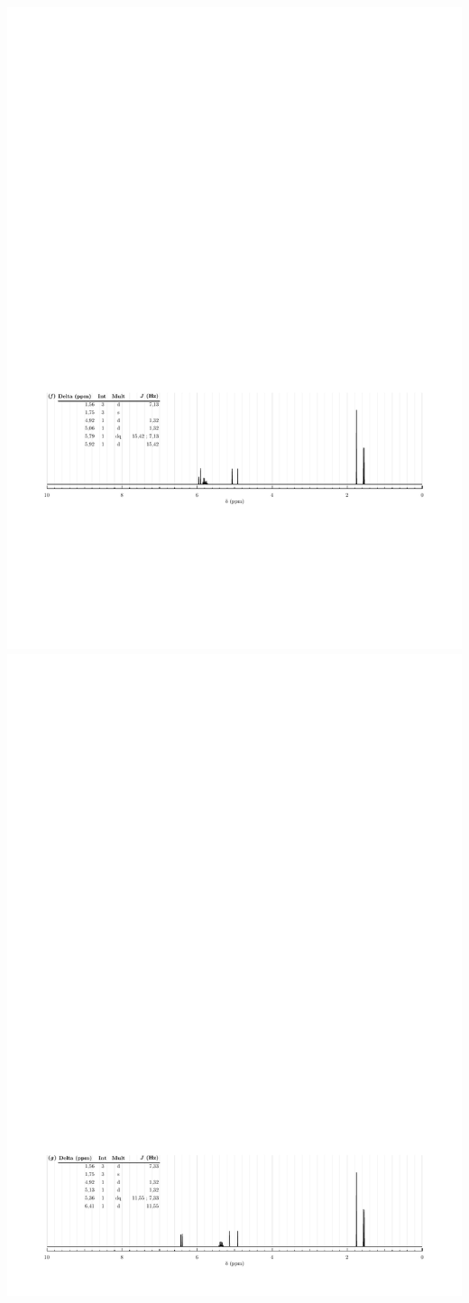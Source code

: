 \begin{center}
    \includegraphics[width=.95\linewidth]{chimiePC/orga/RMN_3E-2.pdf}
    \includegraphics[width=.95\linewidth]{chimiePC/orga/RMN_3Z-2.pdf}

\end{center}
